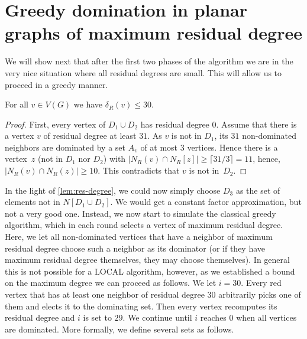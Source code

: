 
\section{Greedy domination in planar graphs of maximum
residual degree}\label{sec:greedy}

We will show next that after the first two phases of the algorithm we
are in the very nice situation where all residual degrees are
small. This will allow us to proceed in a greedy manner.

  \begin{lemma}\label{lem:res-degree}
    For all $v\in V(G)$ we have $\delta_R(v)\leq 30$.
  \end{lemma}
  \begin{proof}
    First, every vertex of $D_1\cup D_2$ has residual degree $0$.
    Assume that there is a vertex $v$ of residual degree at least $31$.
    As $v$ is not in $D_1$, its $31$ non-dominated neighbors are
    dominated by a set $A_v$ of at most 3 vertices. Hence there is a
    vertex~$z$ (not in $D_1$ nor $D_2$) with $|N_R(v)\cap N_R[z]|\geq
    \lceil 31/3\rceil = 11$, hence, $|N_R(v)\cap N_R(z)|\geq 10$.
	This contradicts that $v$ is not in~$D_2$.
  \end{proof}

In the light of \cref{lem:res-degree}, we could now simply choose
$D_3$ as the set of elements not in $N[D_1\cup D_2]$.  We would get a
constant factor approximation, but not a very good one. Instead, we
now start to simulate the classical greedy algorithm, which in each
round selects a vertex of maximum residual degree. Here, we let all
non-dominated vertices that have a neighbor of maximum residual degree
choose such a neighbor as its dominator (or if they have maximum
residual degree themselves, they may choose themselves). In general
this is not possible for a LOCAL algorithm, however, as we established
a bound on the maximum degree we can proceed as follows.  We let
$i=30$. Every red vertex that has at least one neighbor of residual
degree $30$ arbitrarily picks one of them and elects it to the
dominating set. Then every vertex recomputes its residual degree and
$i$ is set to $29$. We continue until $i$ reaches $0$ when all
vertices are dominated. More formally, we define several sets as
follows.

